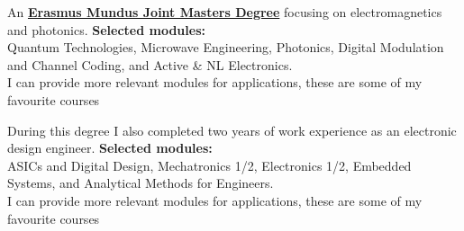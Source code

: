 \documentclass[10pt,a4paper,withhyper]{altacv}
\begin{document}
\begin{paracol}{2}
\smallskip



An \textbf{\href{https://www.eacea.ec.europa.eu/scholarships/erasmus-mundus-catalogue_en}{Erasmus Mundus Joint Masters Degree}} focusing on electromagnetics and photonics. \textbf{Selected modules: } \\
Quantum Technologies, Microwave Engineering, Photonics, Digital Modulation and Channel Coding, and Active \& NL Electronics.\\
{\scriptsize\color{accent}I can provide more relevant modules for applications, these are some of my favourite courses}


\divider

During this degree I also completed two years of work experience as an electronic design engineer. \textbf{Selected modules:} \\
ASICs and Digital Design, Mechatronics 1/2, Electronics 1/2, Embedded Systems, and Analytical Methods for Engineers.\\
{\scriptsize\color{accent}I can provide more relevant modules for applications, these are some of my favourite courses}




\switchcolumn




\end{paracol}
\end{document}
